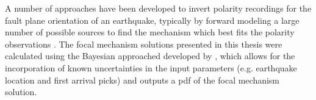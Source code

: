 A number of approaches have been developed to invert polarity recordings for the fault plane orientation of an earthquake, typically by forward modeling a large number of possible sources to find the mechanism which best fits the polarity observations \citep[e.g.][]{Reasenberg_1985,Hardebeck_2002}. The focal mechanism solutions presented in this thesis were calculated using the Bayesian approached developed by \citet{Walsh_2009}, which allows for the incorporation of known uncertainties in the input parameters (e.g. earthquake location and first arrival picks) and outputs a \acrshort{pdf} of the focal mechanism solution.